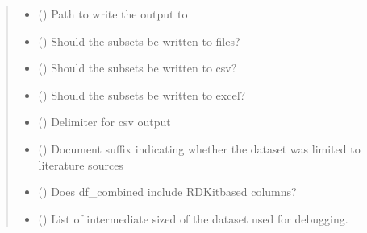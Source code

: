 \documentclass[letterpaper,10pt,english]{sphinxmanual}
\begin{document}
\begin{fulllineitems}
\begin{quote}
\begin{description}
\begin{itemize}
\item {} 
\sphinxAtStartPar
{} () \textendash{} Path to write the output to

\item {} 
\sphinxAtStartPar
{} () \textendash{} Should the subsets be written to files?

\item {} 
\sphinxAtStartPar
{} () \textendash{} Should the subsets be written to csv?

\item {} 
\sphinxAtStartPar
{} () \textendash{} Should the subsets be written to excel?

\item {} 
\sphinxAtStartPar
{} () \textendash{} Delimiter for csv output

\item {} 
\sphinxAtStartPar
{} () \textendash{} Document suffix indicating
whether the dataset was limited to literature sources

\item {} 
\sphinxAtStartPar
{} () \textendash{} Does df\_combined include RDKit\sphinxhyphen{}based columns?

\item {} 
\sphinxAtStartPar
{} (\sphinxstyleliteralemphasis{\sphinxupquote{{[}}}\sphinxstyleliteralemphasis{\sphinxupquote{{[}}}\sphinxstyleliteralemphasis{\sphinxupquote{{]}}}\sphinxstyleliteralemphasis{\sphinxupquote{, }}\sphinxstyleliteralemphasis{\sphinxupquote{{[}}}\sphinxstyleliteralemphasis{\sphinxupquote{{]}}}\sphinxstyleliteralemphasis{\sphinxupquote{{]}}}) \textendash{} List of intermediate sized of the dataset used for debugging.


\end{itemize}
\end{description}
\end{quote}
\end{fulllineitems}
\end{document}
